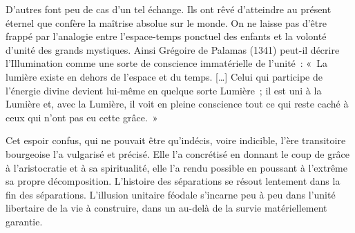 \documentclass[french,twoside]{book} %
\begin{document}
D’autres font peu de cas d’un tel échange. Ils ont rêvé d’atteindre au présent éternel que confère la maîtrise absolue sur le monde. On ne laisse pas d’être frappé par l’analogie entre l’espace-temps ponctuel des enfants et la volonté d’unité des grands mystiques. Ainsi Grégoire de Palamas (1341) peut-il décrire l’Illumination comme une sorte de conscience immatérielle de l’unité : « La lumière existe en dehors de l’espace et du temps. […] Celui qui participe de l’énergie divine devient lui-même en quelque sorte Lumière ; il est uni à la Lumière et, avec la Lumière, il voit en pleine conscience tout ce qui reste caché à ceux qui n’ont pas eu cette grâce. »\par
Cet espoir confus, qui ne pouvait être qu’indécis, voire indicible, l’ère transitoire bourgeoise l’a vulgarisé et précisé. Elle l’a concrétisé en donnant le coup de grâce à l’aristocratie et à sa spiritualité, elle l’a rendu possible en poussant à l’extrême sa propre décomposition. L’histoire des séparations se résout lentement dans la fin des séparations. L’illusion unitaire féodale s’incarne peu à peu dans l’unité libertaire de la vie à construire, dans un au-delà de la survie matériellement garantie.
\end{document}
